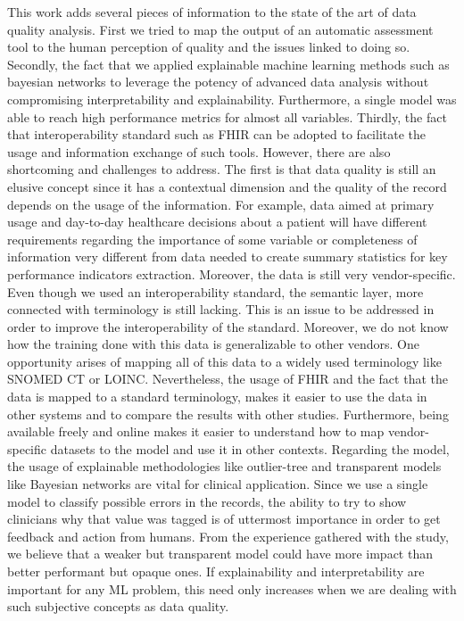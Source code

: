 This work adds several pieces of information to the state of the art of data quality analysis. First we tried to map the output of an automatic assessment tool to the human perception of quality and the issues linked to doing so. Secondly, the fact that we applied explainable machine learning methods such as bayesian networks to leverage the potency of advanced data analysis without compromising interpretability and explainability. Furthermore, a single model was able to reach high performance metrics for almost all variables. Thirdly, the fact that interoperability standard such as FHIR can be adopted to facilitate the usage and information exchange of such tools. However, there are also shortcoming and challenges to address. The first is that data quality is still an elusive concept since it has a contextual dimension and the quality of the record depends on the usage of the information. For example, data aimed at primary usage and day-to-day healthcare decisions about a patient will have different requirements regarding the importance of some variable or completeness of information very different from data needed to create summary statistics for key performance indicators extraction. Moreover, the data is still very vendor-specific. Even though we used an interoperability standard, the semantic layer, more connected with terminology is still lacking. This is an issue to be addressed in order to improve the interoperability of the standard. Moreover, we do not know how the training done with this data is generalizable to other vendors. One opportunity arises of mapping all of this data to a widely used terminology like SNOMED CT or LOINC. Nevertheless, the usage of FHIR and the fact that the data is mapped to a standard terminology, makes it easier to use the data in other systems and to compare the results with other studies. Furthermore, being available freely and online makes it easier to understand how to map vendor-specific datasets to the model and use it in other contexts. Regarding the model, the usage of explainable methodologies like outlier-tree and transparent models like Bayesian networks are vital for clinical application. Since we use a single model to classify possible errors in the records, the ability to try to show clinicians why that value was tagged is of uttermost importance in order to get feedback and action from humans. From the experience gathered with the study, we believe that a weaker but transparent model could have more impact than better performant but opaque ones. If explainability and interpretability are important for any ML problem, this need only increases when we are dealing with such subjective concepts as data quality.

